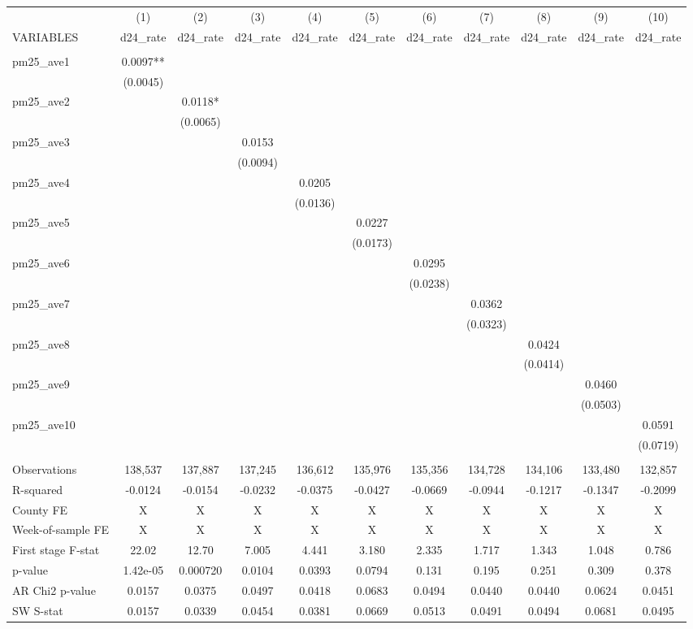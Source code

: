 \begin{tabular}{lcccccccccc} \hline
 & (1) & (2) & (3) & (4) & (5) & (6) & (7) & (8) & (9) & (10) \\
VARIABLES & d24\_rate & d24\_rate & d24\_rate & d24\_rate & d24\_rate & d24\_rate & d24\_rate & d24\_rate & d24\_rate & d24\_rate \\ \hline
 &  &  &  &  &  &  &  &  &  &  \\
pm25\_ave1 & 0.0097** &  &  &  &  &  &  &  &  &  \\
 & (0.0045) &  &  &  &  &  &  &  &  &  \\
pm25\_ave2 &  & 0.0118* &  &  &  &  &  &  &  &  \\
 &  & (0.0065) &  &  &  &  &  &  &  &  \\
pm25\_ave3 &  &  & 0.0153 &  &  &  &  &  &  &  \\
 &  &  & (0.0094) &  &  &  &  &  &  &  \\
pm25\_ave4 &  &  &  & 0.0205 &  &  &  &  &  &  \\
 &  &  &  & (0.0136) &  &  &  &  &  &  \\
pm25\_ave5 &  &  &  &  & 0.0227 &  &  &  &  &  \\
 &  &  &  &  & (0.0173) &  &  &  &  &  \\
pm25\_ave6 &  &  &  &  &  & 0.0295 &  &  &  &  \\
 &  &  &  &  &  & (0.0238) &  &  &  &  \\
pm25\_ave7 &  &  &  &  &  &  & 0.0362 &  &  &  \\
 &  &  &  &  &  &  & (0.0323) &  &  &  \\
pm25\_ave8 &  &  &  &  &  &  &  & 0.0424 &  &  \\
 &  &  &  &  &  &  &  & (0.0414) &  &  \\
pm25\_ave9 &  &  &  &  &  &  &  &  & 0.0460 &  \\
 &  &  &  &  &  &  &  &  & (0.0503) &  \\
pm25\_ave10 &  &  &  &  &  &  &  &  &  & 0.0591 \\
 &  &  &  &  &  &  &  &  &  & (0.0719) \\
 &  &  &  &  &  &  &  &  &  &  \\
Observations & 138,537 & 137,887 & 137,245 & 136,612 & 135,976 & 135,356 & 134,728 & 134,106 & 133,480 & 132,857 \\
R-squared & -0.0124 & -0.0154 & -0.0232 & -0.0375 & -0.0427 & -0.0669 & -0.0944 & -0.1217 & -0.1347 & -0.2099 \\
County FE & X & X & X & X & X & X & X & X & X & X \\
Week-of-sample FE & X & X & X & X & X & X & X & X & X & X \\
First stage F-stat & 22.02 & 12.70 & 7.005 & 4.441 & 3.180 & 2.335 & 1.717 & 1.343 & 1.048 & 0.786 \\
p-value & 1.42e-05 & 0.000720 & 0.0104 & 0.0393 & 0.0794 & 0.131 & 0.195 & 0.251 & 0.309 & 0.378 \\
AR Chi2 p-value & 0.0157 & 0.0375 & 0.0497 & 0.0418 & 0.0683 & 0.0494 & 0.0440 & 0.0440 & 0.0624 & 0.0451 \\
 SW S-stat & 0.0157 & 0.0339 & 0.0454 & 0.0381 & 0.0669 & 0.0513 & 0.0491 & 0.0494 & 0.0681 & 0.0495 \\ \hline
\end{tabular}
